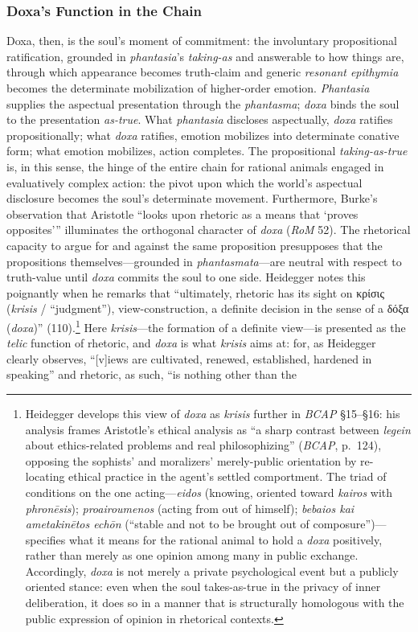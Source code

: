 \documentclass{article}
\newcommand{\gk}[1]{{\greekfont #1}}
\begin{document}
\subsubsection*{Doxa's Function in the Chain}

Doxa, then, is the soul's moment of commitment: the involuntary propositional ratification, grounded in \textit{phantasia}'s \textit{taking-as} and answerable to how things are, through which appearance becomes truth-claim and generic \textit{resonant epithymia} becomes the determinate mobilization of higher-order emotion. \textit{Phantasia} supplies the aspectual presentation through the \textit{phantasma}; \textit{doxa} binds the soul to the presentation \textit{as-true}. What \textit{phantasia} discloses aspectually, \textit{doxa} ratifies propositionally; what \textit{doxa} ratifies, emotion mobilizes into determinate conative form; what emotion mobilizes, action completes. The propositional \textit{taking-as-true} is, in this sense, the hinge of the entire chain for rational animals engaged in evaluatively complex action: the pivot upon which the world's aspectual disclosure becomes the soul's determinate movement. Furthermore, Burke's observation that Aristotle ``looks upon rhetoric as a means that `proves opposites''' illuminates the orthogonal character of \textit{doxa} (\textit{RoM} 52). The rhetorical capacity to argue for and against the same proposition presupposes that the propositions themselves---grounded in \textit{phantasmata}---are neutral with respect to truth-value until \textit{doxa} commits the soul to one side. Heidegger notes this poignantly when he remarks that ``ultimately, rhetoric has its sight on \gk{κρίσις} (\textit{krisis} / ``judgment''), view-construction, a definite decision in the sense of a \gk{δόξα} (\textit{doxa})'' (110).\footnote{Heidegger develops this view of \textit{doxa} as \textit{krisis} further in \textit{BCAP} §15--§16: his analysis frames Aristotle's ethical analysis as ``a sharp contrast between \textit{legein} about ethics-related problems and real philosophizing'' (\textit{BCAP}, p.~124), opposing the sophists' and moralizers' merely-public orientation by re-locating ethical practice in the agent's settled comportment. The triad of conditions on the one acting---\textit{eidos} (knowing, oriented toward \textit{kairos} with \textit{phronēsis}); \textit{proairoumenos} (acting from out of himself); \textit{bebaios kai ametakinētos echōn} (``stable and not to be brought out of composure'')---specifies what it means for the rational animal to hold a \textit{doxa} positively, rather than merely as one opinion among many in public exchange. Accordingly, \textit{doxa} is not merely a private psychological event but a publicly oriented stance: even when the soul takes-as-true in the privacy of inner deliberation, it does so in a manner that is structurally homologous with the public expression of opinion in rhetorical contexts.} Here \textit{krisis}---the formation of a definite view---is presented as the \textit{telic} function of rhetoric, and \textit{doxa} is what \textit{krisis} aims at: for, as Heidegger clearly observes, ``[v]iews are cultivated, renewed, established, hardened in speaking'' and rhetoric, as such, ``is nothing other than the 
\end{document}
